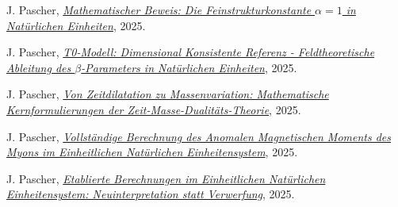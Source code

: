 \documentclass[12pt,a4paper]{article}
\begin{document}
	\begin{thebibliography}{99}
		J. Pascher, \href{https://github.com/jpascher/T0-Time-Mass-Duality/blob/main/2/pdf/ResolvingTheConstantsAlfaEn.pdf}{\textit{Mathematischer Beweis: Die Feinstrukturkonstante $\alpha = 1$ in Natürlichen Einheiten}}, 2025.
		
		J. Pascher, \href{https://github.com/jpascher/T0-Time-Mass-Duality/blob/main/2/pdf/DerivationVonBetaEn.pdf}{\textit{T0-Modell: Dimensional Konsistente Referenz - Feldtheoretische Ableitung des $\beta$-Parameters in Natürlichen Einheiten}}, 2025.
		
		J. Pascher, \href{https://github.com/jpascher/T0-Time-Mass-Duality/blob/main/2/pdf/MathZeitMasseLagrangeEn.pdf}{\textit{Von Zeitdilatation zu Massenvariation: Mathematische Kernformulierungen der Zeit-Masse-Dualitäts-Theorie}}, 2025.
		
		J. Pascher, \href{https://github.com/jpascher/T0-Time-Mass-Duality/blob/main/2/pdf/CompleteMuon_g-2_AnalysisEn.pdf}{\textit{Vollständige Berechnung des Anomalen Magnetischen Moments des Myons im Einheitlichen Natürlichen Einheitensystem}}, 2025.
		
		J. Pascher, \href{https://github.com/jpascher/T0-Time-Mass-Duality/blob/main/2/pdf/PragmaticApproachT0-ModelEn.pdf}{\textit{Etablierte Berechnungen im Einheitlichen Natürlichen Einheitensystem: Neuinterpretation statt Verwerfung}}, 2025.
		
		
	\end{thebibliography}
	
\end{document}
